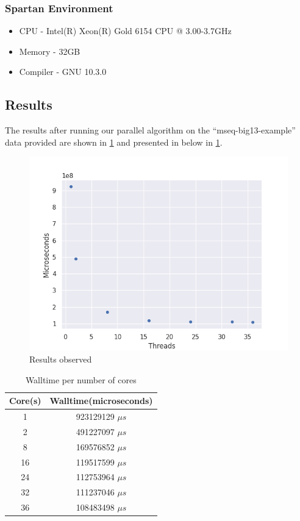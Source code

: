 \documentclass[manuscript,screen, nonacm=true]{acmart}
\begin{document}
\subsubsection{Spartan Environment}
\begin{itemize}
    \item CPU - Intel(R) Xeon(R) Gold 6154 CPU @ 3.00-3.7GHz
    \item Memory - 32GB 
    \item Compiler - GNU 10.3.0
\end{itemize}




\subsection{Results}
The results after running our parallel algorithm on the ``mseq-big13-example'' data provided are shown in \cref{fig:results} and presented in below in \cref{table:results}. 
\begin{figure}[!ht]
    \centering
    \includegraphics[scale=0.6]{res}
    \caption{Results observed}
    \label{fig:results}
\end{figure}

\begin{table}[!h]
    \begin{tabular}{||c|c||}
        \hline
        Core(s) & Walltime(microseconds) \\ \hline
        1       & 923129129 $\mu s$ \\ 
        \hline
        2       & 491227097 $\mu s$ \\
        \hline
        8       & 169576852 $\mu s$ \\
        \hline
        16      & 119517599 $\mu s$ \\
        \hline
        24      & 112753964 $\mu s$ \\
        \hline
        32      & 111237046 $\mu s$ \\
        \hline
        36      & 108483498 $\mu s$ \\
        \hline
    \end{tabular}
    \label{table:results}
    \caption{Walltime per number of cores}
\end{table}
\end{document}
